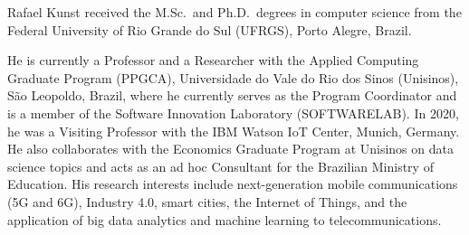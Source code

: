 \documentclass{ieeeaccess}
\begin{document}
\begin{IEEEbiographynophoto}{Rafael Kunst}
received the M.Sc.\ and Ph.D.\ degrees in computer science from the
Federal University of Rio Grande do Sul (UFRGS), Porto Alegre, Brazil.

He is currently a Professor and a Researcher with the Applied Computing
Graduate Program (PPGCA), Universidade do Vale do Rio dos Sinos
(Unisinos), S\~ao Leopoldo, Brazil, where he currently serves as the
Program Coordinator and is a member of the Software Innovation
Laboratory (SOFTWARELAB). In 2020, he was a Visiting Professor with the
IBM Watson IoT Center, Munich, Germany. He also collaborates with the
Economics Graduate Program at Unisinos on data science topics and acts
as an ad hoc Consultant for the Brazilian Ministry of Education. His
research interests include next-generation mobile communications (5G
and 6G), Industry 4.0, smart cities, the Internet of Things, and the
application of big data analytics and machine learning to
telecommunications.
\end{IEEEbiographynophoto}

\EOD
\end{document}
